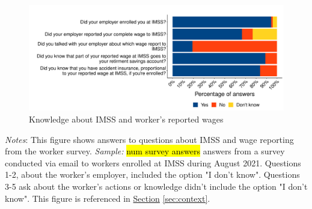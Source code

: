 \documentclass[oneside,11pt]{article}
\begin{document}
\begin{figure}[H]
    \centering
    \caption{Knowledge about IMSS and worker's reported wages \label{fig:hist_knowledge_register_survey}}
    \includegraphics[width=\textwidth]{04_Figures/worker_survey/hist_knowledge_register_survey.pdf}
\end{figure}
\scriptsize{\textit{Notes}: This figure shows answers to questions about IMSS and wage reporting from the worker survey. \textit{Sample:} \hl{num survey answers} answers from a survey conducted via email to workers enrolled at IMSS during August 2021. Questions 1-2, about the worker's employer, included the option "I don't know". Questions 3-5 ask about the worker's actions or knowledge didn't include the option "I don't know".  This figure is referenced in \hyperref[sec:context]{Section} \ref{sec:context}.}
\end{document}
